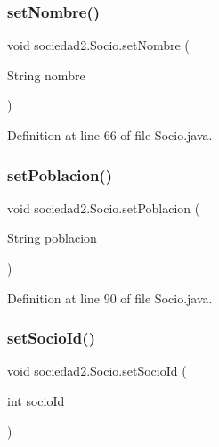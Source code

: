 \mbox{\label{classsociedad2_1_1_socio_aa15275f5ee8e2173249d29600c6615f4}} 
\subsubsection{\texorpdfstring{set\+Nombre()}{setNombre()}}
{\footnotesize\ttfamily void sociedad2.\+Socio.\+set\+Nombre (\begin{DoxyParamCaption}\item[{String}]{nombre }\end{DoxyParamCaption})}



Definition at line 66 of file Socio.\+java.

\mbox{\label{classsociedad2_1_1_socio_a75812ed455981e7536229b14c2b54cab}} 
\subsubsection{\texorpdfstring{set\+Poblacion()}{setPoblacion()}}
{\footnotesize\ttfamily void sociedad2.\+Socio.\+set\+Poblacion (\begin{DoxyParamCaption}\item[{String}]{poblacion }\end{DoxyParamCaption})}



Definition at line 90 of file Socio.\+java.

\mbox{\label{classsociedad2_1_1_socio_ad41e542f71e29f595bddea81e1064fc0}} 
\subsubsection{\texorpdfstring{set\+Socio\+Id()}{setSocioId()}}
{\footnotesize\ttfamily void sociedad2.\+Socio.\+set\+Socio\+Id (\begin{DoxyParamCaption}\item[{int}]{socio\+Id }\end{DoxyParamCaption})}



